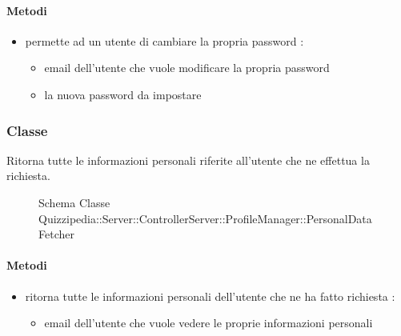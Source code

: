 \paragraph{Metodi}
\begin{itemize}
\item {}
\newline
permette ad un utente di cambiare la propria password
\newline
{} :
\begin{itemize}
\item {}
\newline
email dell'utente che vuole modificare la propria password
\item {}
\newline
la nuova password da impostare
\end{itemize}
\end{itemize}
\subsubsection{Classe }
Ritorna tutte le informazioni personali riferite all'utente che ne effettua la richiesta.
\begin{figure}[H]
\centering
\noindent{}
\caption[Schema Classe PersonalDataFetcher]{Schema Classe Quizzipedia::Server::ControllerServer::ProfileManager::PersonalDataFetcher}
\end{figure}
\paragraph{Metodi}
\begin{itemize}
\item {}
\newline
ritorna tutte le informazioni personali dell'utente che ne ha fatto richiesta
\newline
{} :
\begin{itemize}
\item {}
\newline
email dell'utente che vuole vedere le proprie informazioni personali
\end{itemize}
\end{itemize}
